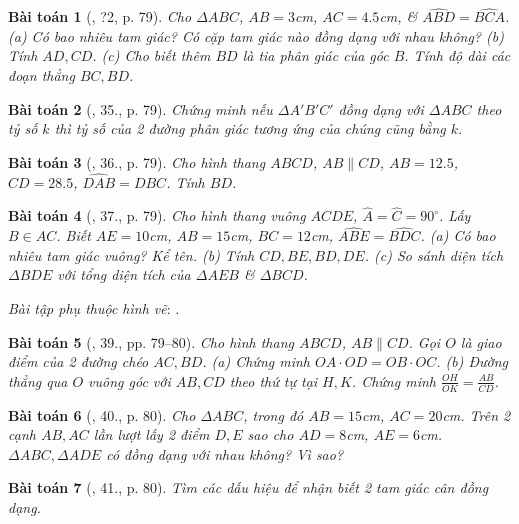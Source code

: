 \documentclass{article}
\newtheorem{baitoan}{Bài toán}
\begin{document}
\begin{baitoan}[\cite{SGK_Toan_8_tap_2}, ?2, p. 79]
	Cho $\Delta ABC$, $AB = 3$\emph{cm}, $AC = 4.5$\emph{cm}, \& $\widehat{ABD} = \widehat{BCA}$. (a) Có bao nhiêu tam giác? Có cặp tam giác nào đồng dạng với nhau không? (b) Tính $AD,CD$. (c) Cho biết thêm $BD$ là tia phân giác của góc $B$. Tính độ dài các đoạn thẳng $BC,BD$.
\end{baitoan}

\begin{baitoan}[\cite{SGK_Toan_8_tap_2}, 35., p. 79]
	Chứng minh nếu $\Delta A'B'C'$ đồng dạng với $\Delta ABC$ theo tỷ số $k$ thì tỷ số của 2 đường phân giác tương ứng của chúng cũng bằng $k$.
\end{baitoan}

\begin{baitoan}[\cite{SGK_Toan_8_tap_2}, 36., p. 79]
	Cho hình thang $ABCD$, $AB\parallel CD$, $AB = 12.5$, $CD = 28.5$, $\widehat{DAB} = \widehat{DBC}$. Tính $BD$.
\end{baitoan}

\begin{baitoan}[\cite{SGK_Toan_8_tap_2}, 37., p. 79]
	Cho hình thang vuông $ACDE$, $\widehat{A} = \widehat{C} = 90^\circ$. Lấy $B\in AC$. Biết $AE = 10$\emph{cm}, $AB = 15$\emph{cm}, $BC = 12$\emph{cm}, $\widehat{ABE} = \widehat{BDC}$. (a) Có bao nhiêu tam giác vuông? Kể tên. (b) Tính $CD,BE,BD,DE$. (c) So sánh diện tích $\Delta BDE$ với tổng diện tích của $\Delta AEB$ \& $\Delta BCD$.
\end{baitoan}
\noindent\textit{Bài tập phụ thuộc hình vẽ}: \cite[38., p. 79]{SGK_Toan_8_tap_2}.

\begin{baitoan}[\cite{SGK_Toan_8_tap_2}, 39., pp. 79--80]
	Cho hình thang $ABCD$, $AB\parallel CD$. Gọi $O$ là giao điểm của 2 đường chéo $AC,BD$. (a) Chứng minh $OA\cdot OD = OB\cdot OC$. (b) Đường thẳng qua $O$ vuông góc với $AB,CD$ theo thứ tự tại $H,K$. Chứng minh $\frac{OH}{OK} = \frac{AB}{CD}$.
\end{baitoan}

\begin{baitoan}[\cite{SGK_Toan_8_tap_2}, 40., p. 80]
	Cho $\Delta ABC$, trong đó $AB = 15$\emph{cm}, $AC = 20$\emph{cm}. Trên 2 cạnh $AB,AC$ lần lượt lấy 2 điểm $D,E$ sao cho $AD = 8$\emph{cm}, $AE = 6$\emph{cm}. $\Delta ABC,\Delta ADE$ có đồng dạng với nhau không? Vì sao?	
\end{baitoan}

\begin{baitoan}[\cite{SGK_Toan_8_tap_2}, 41., p. 80]
	Tìm các dấu hiệu để nhận biết 2 tam giác cân đồng dạng.
\end{baitoan}
\end{document}
